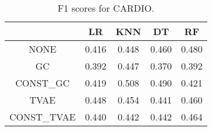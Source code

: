 \begin{table}
\caption{F1 scores for CARDIO.}
\label{tab:f1-CARDIO}
\begin{tabular}{ccccc}
\toprule
 & LR & KNN & DT & RF \\
\midrule
NONE & 0.416 & 0.448 & 0.460 & 0.480 \\
GC & 0.392 & 0.447 & 0.370 & 0.392 \\
CONST\_GC & 0.419 & 0.508 & 0.490 & 0.421 \\
TVAE & 0.448 & 0.454 & 0.441 & 0.460 \\
CONST\_TVAE & 0.440 & 0.442 & 0.442 & 0.464 \\
\bottomrule
\end{tabular}
\end{table}
